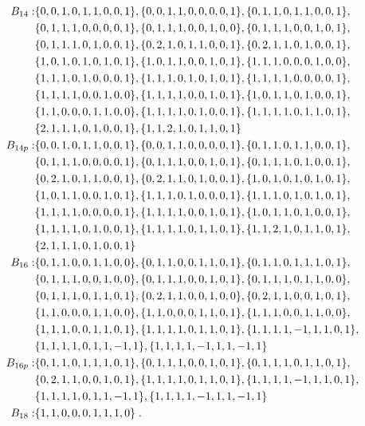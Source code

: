 \documentclass[11pt,a4paper]{article}
\begin{document}
\begin{align}
%
B_{14} :&
\{0, 0, 1, 0, 1, 1, 0, 0, 1\}, \{0, 0, 1, 1, 0, 0, 0, 0, 1\}, \{0, 1, 1, 0, 1, 1, 0, 0, 1\},  \nn
\{0, 1, 1, 1, 0, 0, 0, 0, 1\}, \{0, 1, 1, 1, 0, 0, 1, 0, 0\}, \{0, 1, 1, 1, 0, 0, 1, 0, 1\},  \nn
\{0, 1, 1, 1, 0, 1, 0, 0, 1\}, \{0, 2, 1, 0, 1, 1, 0, 0, 1\}, \{0, 2, 1, 1, 0, 1, 0, 0, 1\},  \nn
\{1, 0, 1, 0, 1, 0, 1, 0, 1\}, \{1, 0, 1, 1, 0, 0, 1, 0, 1\}, \{1, 1, 1, 0, 0, 0, 1, 0, 0\},  \nn
\{1, 1, 1, 0, 1, 0, 0, 0, 1\}, \{1, 1, 1, 0, 1, 0, 1, 0, 1\}, \{1, 1, 1, 1, 0, 0, 0, 0, 1\},  \nn
\{1, 1, 1, 1, 0, 0, 1, 0, 0\}, \{1, 1, 1, 1, 0, 0, 1, 0, 1\}, \{1, 0, 1, 1, 0, 1, 0, 0, 1\},  \nn
\{1, 1, 0, 0, 0, 1, 1, 0, 0\}, \{1, 1, 1, 1, 0, 1, 0, 0, 1\}, \{1, 1, 1, 1, 0, 1, 1, 0, 1\},  \nn
\{2, 1, 1, 1, 0, 1, 0, 0, 1\}, \{1, 1, 2, 1, 0, 1, 1, 0, 1\}
\nonumber\\
%
B_{14p} :&
\{0, 0, 1, 0, 1, 1, 0, 0, 1\}, \{0, 0, 1, 1, 0, 0, 0, 0, 1\}, \{0, 1, 1, 0, 1, 1, 0, 0, 1\},  \nn
\{0, 1, 1, 1, 0, 0, 0, 0, 1\}, \{0, 1, 1, 1, 0, 0, 1, 0, 1\}, \{0, 1, 1, 1, 0, 1, 0, 0, 1\},  \nn
\{0, 2, 1, 0, 1, 1, 0, 0, 1\}, \{0, 2, 1, 1, 0, 1, 0, 0, 1\}, \{1, 0, 1, 0, 1, 0, 1, 0, 1\},  \nn
\{1, 0, 1, 1, 0, 0, 1, 0, 1\}, \{1, 1, 1, 0, 1, 0, 0, 0, 1\}, \{1, 1, 1, 0, 1, 0, 1, 0, 1\},  \nn
\{1, 1, 1, 1, 0, 0, 0, 0, 1\}, \{1, 1, 1, 1, 0, 0, 1, 0, 1\}, \{1, 0, 1, 1, 0, 1, 0, 0, 1\},  \nn
\{1, 1, 1, 1, 0, 1, 0, 0, 1\}, \{1, 1, 1, 1, 0, 1, 1, 0, 1\}, \{1, 1, 2, 1, 0, 1, 1, 0, 1\},  \nn
\{2, 1, 1, 1, 0, 1, 0, 0, 1\}
\nonumber\\
%
B_{16} :&
\{0, 1, 1, 0, 0, 1, 1, 0, 0\}, \{0, 1, 1, 0, 0, 1, 1, 0, 1\}, \{0, 1, 1, 0, 1, 1, 1, 0, 1\},  \nn
\{0, 1, 1, 1, 0, 0, 1, 0, 0\}, \{0, 1, 1, 1, 0, 0, 1, 0, 1\}, \{0, 1, 1, 1, 0, 1, 1, 0, 0\},  \nn
\{0, 1, 1, 1, 0, 1, 1, 0, 1\}, \{0, 2, 1, 1, 0, 0, 1, 0, 0\}, \{0, 2, 1, 1, 0, 0, 1, 0, 1\},  \nn
\{1, 1, 0, 0, 0, 1, 1, 0, 0\}, \{1, 1, 0, 0, 0, 1, 1, 0, 1\}, \{1, 1, 1, 0, 0, 1, 1, 0, 0\},  \nn
\{1, 1, 1, 0, 0, 1, 1, 0, 1\},
  \{1, 1, 1, 1, 0, 1, 1, 0, 1\},  \{1, 1, 1, 1, -1, 1, 1, 0, 1\},  \nn
  \{1, 1, 1, 1, 0, 1, 1, -1, 1\}, \{1, 1, 1, 1, -1, 1, 1, -1, 1\}
\nonumber\\
%
B_{16p} :&
\{0, 1, 1, 0, 1, 1, 1, 0, 1\}, \{0, 1, 1, 1, 0, 0, 1, 0, 1\}, \{0, 1, 1, 1, 0, 1, 1, 0, 1\},  \nn
\{0, 2, 1, 1, 0, 0, 1, 0, 1\},
  \{1, 1, 1, 1, 0, 1, 1, 0, 1\},  \{1, 1, 1, 1, -1, 1, 1, 0, 1\},  \nn
  \{1, 1, 1, 1, 0, 1, 1, -1, 1\}, \{1, 1, 1, 1, -1, 1, 1, -1, 1\}
\nonumber\\
%
B_{18} :& \{1, 1, 0, 0, 0, 1, 1, 1, 0\}\;.
\label{eq:miB14}
\end{align}
%
%
\end{document}

